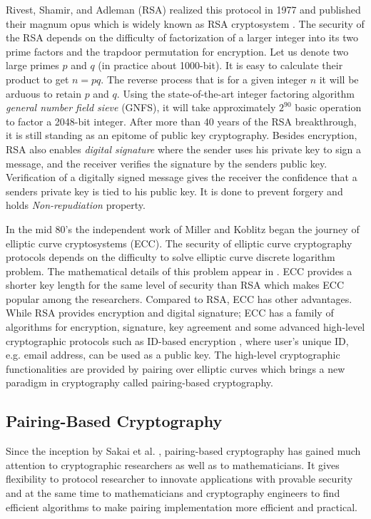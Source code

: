 Rivest, Shamir, and Adleman (RSA) realized this protocol in 1977 and published their magnum opus which is widely known as RSA cryptosystem \cite{rivest1978method}. 
The security of the RSA depends on the difficulty of factorization of a larger integer into its two prime factors and the trapdoor permutation for encryption.
Let us denote two large primes $p$ and $q$ (in practice about 1000-bit).
It is easy to calculate their product to get $n = pq$.
The reverse process that is for a given integer $n$ it will be arduous to retain $p$ and $q$.
Using the state-of-the-art integer factoring algorithm \textit{general number field sieve }(GNFS), it will take approximately $2^{90}$ basic operation to factor a 2048-bit integer.
After more than 40 years of the RSA breakthrough, it is still standing as an epitome of public key cryptography.
Besides encryption, RSA also enables \textit{digital signature }where the sender uses his private key to sign a message, and the receiver verifies the signature by the senders public key. 
Verification of a digitally signed message gives the receiver the confidence that a senders private key is tied to his public key.
It is done to prevent forgery and holds \textit{Non-repudiation} property.

In the mid 80's the independent work of Miller \cite{C:Miller85} and Koblitz \cite{koblitz1987elliptic} began the journey of elliptic curve cryptosystems (ECC). 
The security of elliptic curve cryptography protocols depends on the difficulty to solve elliptic curve discrete logarithm problem.
The mathematical details of this problem appear in . %
ECC provides a shorter key length for the same level of security than RSA which makes ECC  popular among the researchers. 
Compared to RSA, ECC has other advantages. 
While RSA provides encryption and digital signature; ECC has a family of algorithms for encryption, signature, key agreement and some advanced high-level cryptographic protocols such as ID-based encryption \cite{AC:BonLynSha01}, where user's unique ID, e.g. email address, can be used as a public key. 
The high-level cryptographic functionalities are provided by pairing over elliptic curves \cite{book_GPCMrabet2016} which brings a new paradigm in cryptography called pairing-based cryptography.

\subsection{Pairing-Based Cryptography}  
\label{ch1_subsec_pbc}
Since the inception by Sakai et al. \cite{sakai2000cryptosystems}, pairing-based cryptography has gained much attention to cryptographic researchers as well as  to mathematicians. It gives flexibility to protocol researcher to innovate applications with provable security and at the same time to mathematicians and cryptography engineers to find efficient algorithms to make pairing implementation more efficient and practical.

